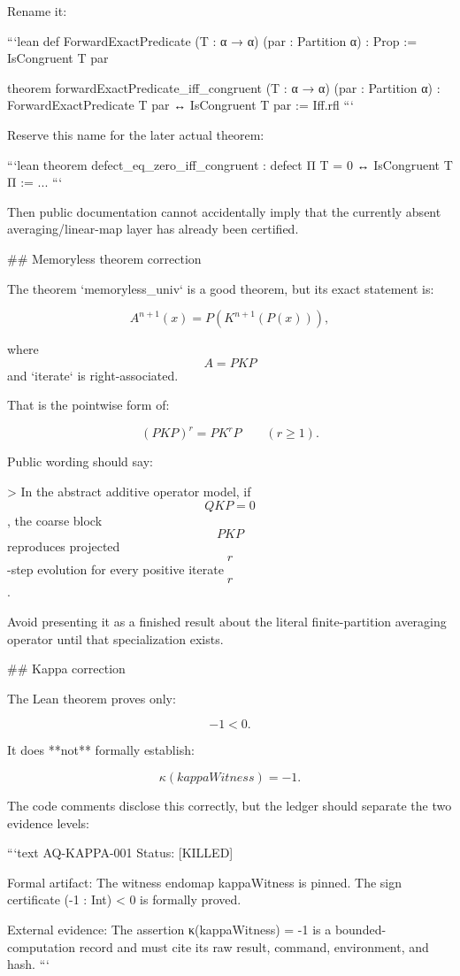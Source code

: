 Rename it:

```lean
def ForwardExactPredicate
    (T : α → α) (par : Partition α) : Prop :=
  IsCongruent T par

theorem forwardExactPredicate_iff_congruent
    (T : α → α) (par : Partition α) :
    ForwardExactPredicate T par ↔ IsCongruent T par :=
  Iff.rfl
```

Reserve this name for the later actual theorem:

```lean
theorem defect_eq_zero_iff_congruent :
    defect Π T = 0 ↔ IsCongruent T Π := ...
```

Then public documentation cannot accidentally imply that the currently absent averaging/linear-map layer has already been certified.

## Memoryless theorem correction

The theorem `memoryless_univ` is a good theorem, but its exact statement is:

$$
A^{n+1}(x)=P(K^{n+1}(P(x))),
$$

where $$A=PKP$$ and `iterate` is right-associated.

That is the pointwise form of:

$$
(PKP)^r=PK^rP
\qquad(r\ge1).
$$

Public wording should say:

> In the abstract additive operator model, if $$QKP=0$$, the coarse block $$PKP$$ reproduces projected $$r$$-step evolution for every positive iterate $$r$$.

Avoid presenting it as a finished result about the literal finite-partition averaging operator until that specialization exists.

## Kappa correction

The Lean theorem proves only:

$$
-1<0.
$$

It does **not** formally establish:

$$
\kappa(kappaWitness)=-1.
$$

The code comments disclose this correctly, but the ledger should separate the two evidence levels:

```text
AQ-KAPPA-001
Status: [KILLED]

Formal artifact:
The witness endomap kappaWitness is pinned.
The sign certificate (-1 : Int) < 0 is formally proved.

External evidence:
The assertion κ(kappaWitness) = -1 is a bounded-computation record
and must cite its raw result, command, environment, and hash.
```


